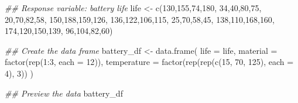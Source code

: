 \documentclass[
  letterpaper,
]{scrbook}
\newenvironment{Shaded}{\begin{snugshade}}{\end{snugshade}}
\newcommand{\AttributeTok}[1]{\textcolor[rgb]{0.40,0.45,0.13}{#1}}
\newcommand{\DecValTok}[1]{\textcolor[rgb]{0.68,0.00,0.00}{#1}}
\newcommand{\DocumentationTok}[1]{\textcolor[rgb]{0.37,0.37,0.37}{\textit{#1}}}
\newcommand{\FunctionTok}[1]{\textcolor[rgb]{0.28,0.35,0.67}{#1}}
\newcommand{\NormalTok}[1]{\textcolor[rgb]{0.00,0.23,0.31}{#1}}
\newcommand{\OtherTok}[1]{\textcolor[rgb]{0.00,0.23,0.31}{#1}}
\newcommand{\SpecialCharTok}[1]{\textcolor[rgb]{0.37,0.37,0.37}{#1}}
\begin{document}
\begin{Shaded}
\begin{Highlighting}[]
\DocumentationTok{\#\# Response variable: battery life}
\NormalTok{life }\OtherTok{\textless{}{-}} \FunctionTok{c}\NormalTok{(}\DecValTok{130}\NormalTok{,}\DecValTok{155}\NormalTok{,}\DecValTok{74}\NormalTok{,}\DecValTok{180}\NormalTok{,  }\DecValTok{34}\NormalTok{,}\DecValTok{40}\NormalTok{,}\DecValTok{80}\NormalTok{,}\DecValTok{75}\NormalTok{,   }\DecValTok{20}\NormalTok{,}\DecValTok{70}\NormalTok{,}\DecValTok{82}\NormalTok{,}\DecValTok{58}\NormalTok{,}
          \DecValTok{150}\NormalTok{,}\DecValTok{188}\NormalTok{,}\DecValTok{159}\NormalTok{,}\DecValTok{126}\NormalTok{, }\DecValTok{136}\NormalTok{,}\DecValTok{122}\NormalTok{,}\DecValTok{106}\NormalTok{,}\DecValTok{115}\NormalTok{, }\DecValTok{25}\NormalTok{,}\DecValTok{70}\NormalTok{,}\DecValTok{58}\NormalTok{,}\DecValTok{45}\NormalTok{,}
          \DecValTok{138}\NormalTok{,}\DecValTok{110}\NormalTok{,}\DecValTok{168}\NormalTok{,}\DecValTok{160}\NormalTok{, }\DecValTok{174}\NormalTok{,}\DecValTok{120}\NormalTok{,}\DecValTok{150}\NormalTok{,}\DecValTok{139}\NormalTok{, }\DecValTok{96}\NormalTok{,}\DecValTok{104}\NormalTok{,}\DecValTok{82}\NormalTok{,}\DecValTok{60}\NormalTok{)}

\DocumentationTok{\#\# Create the data frame}
\NormalTok{battery\_df }\OtherTok{\textless{}{-}} \FunctionTok{data.frame}\NormalTok{(}
  \AttributeTok{life =}\NormalTok{ life,}
  \AttributeTok{material =} \FunctionTok{factor}\NormalTok{(}\FunctionTok{rep}\NormalTok{(}\DecValTok{1}\SpecialCharTok{:}\DecValTok{3}\NormalTok{, }\AttributeTok{each =} \DecValTok{12}\NormalTok{)),}
  \AttributeTok{temperature =} \FunctionTok{factor}\NormalTok{(}\FunctionTok{rep}\NormalTok{(}\FunctionTok{rep}\NormalTok{(}\FunctionTok{c}\NormalTok{(}\DecValTok{15}\NormalTok{, }\DecValTok{70}\NormalTok{, }\DecValTok{125}\NormalTok{), }\AttributeTok{each =} \DecValTok{4}\NormalTok{), }\DecValTok{3}\NormalTok{))}
\NormalTok{)}

\DocumentationTok{\#\# Preview the data}
\NormalTok{battery\_df}
\end{Highlighting}
\end{Shaded}
\end{document}
